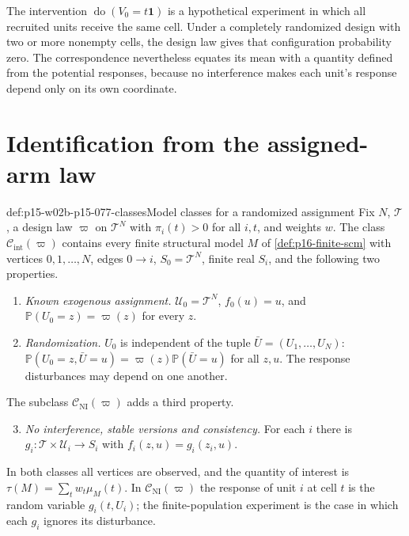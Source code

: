 The intervention \(\operatorname{do}(V_0=t\mathbf 1)\) is a hypothetical
experiment in which all recruited units receive the same cell. Under a
completely randomized design with two or more nonempty cells, the design law
gives that configuration probability zero. The correspondence nevertheless
equates its mean with a quantity defined from the potential responses,
because no interference makes each unit's response depend only on its own
coordinate.

\section{Identification from the assigned-arm law}
\label{sec:p15-w02b-p15-077-identification}

\begin{hbdefinition}{def:p15-w02b-p15-077-classes}{Model classes for a randomized assignment}
Fix \(N\), \(\mathcal T\), a design law \(\varpi\) on
\(\mathcal T^N\) with \(\pi_i(t)>0\) for all \(i,t\), and weights
\(w\). The class \(\mathcal C_{\mathrm{int}}(\varpi)\) contains every
finite structural model \(M\) of \cref{def:p16-finite-scm} with
vertices \(0,1,\ldots,N\), edges \(0\to i\), \(S_0=\mathcal T^N\),
finite real \(S_i\), and the following two properties.
\begin{enumerate}
\item \emph{Known exogenous assignment.} \(\mathcal U_0=\mathcal T^N\),
      \(f_0(u)=u\), and \(\mathbb P(U_0=z)=\varpi(z)\) for every
      \(z\).
\item \emph{Randomization.} \(U_0\) is independent of the tuple
      \(\bar U=(U_1,\ldots,U_N)\):
      \(\mathbb P(U_0=z,\bar U=u)=\varpi(z)\mathbb P(\bar U=u)\)
      for all \(z,u\). The response disturbances may depend on one another.
\end{enumerate}
The subclass \(\mathcal C_{\mathrm{NI}}(\varpi)\) adds a third property.
\begin{enumerate}\setcounter{enumi}{2}
\item \emph{No interference, stable versions and consistency.} For each
      \(i\) there is \(g_i:\mathcal T\times\mathcal U_i\to S_i\) with
      \(f_i(z,u)=g_i(z_i,u)\).
\end{enumerate}
In both classes all vertices are observed, and the quantity of interest is
\(\tau(M)=\sum_tw_t\mu_M(t)\). In \(\mathcal C_{\mathrm{NI}}(\varpi)\)
the response of unit \(i\) at cell \(t\) is the random variable
\(g_i(t,U_i)\); the finite-population experiment is the case in which each
\(g_i\) ignores its disturbance.
\end{hbdefinition}

